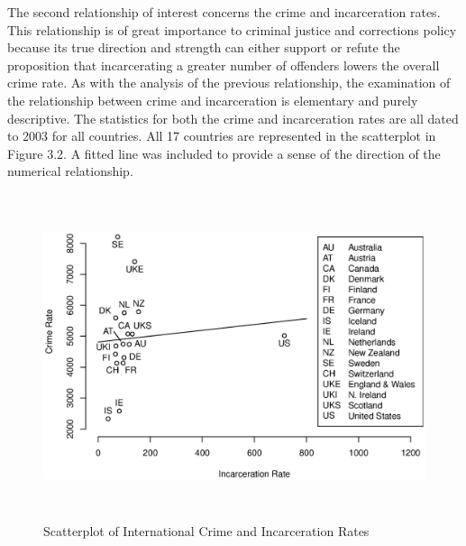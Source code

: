 %

The second relationship of interest concerns the crime and incarceration rates.  This relationship is of great importance to criminal justice and corrections policy because its true direction and strength can either support or refute the proposition that incarcerating a greater number of offenders lowers the overall crime rate.  As with the analysis of the previous relationship, the examination of the relationship between crime and incarceration is elementary and purely descriptive.  The statistics for both the crime and incarceration rates are all dated to 2003 for all countries.  All 17 countries are represented in the scatterplot in Figure 3.2.  A fitted line was included to provide a sense of the direction of the numerical relationship.

\begin{figure}[b]
\begin{center}
\includegraphics[width=5.9in, height=3.75in, keepaspectratio=true]{graph301c.eps}
\caption{Scatterplot of International Crime and Incarceration Rates}
\end{center}
\end{figure}

